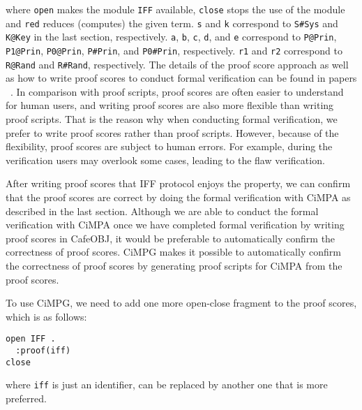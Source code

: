\documentclass[10pt, conference, compsocconf]{IEEEtran}
\begin{document}
	\noindent
	where \verb!open! makes the module \verb!IFF! available, \verb!close! stops the use of the module and \verb!red! reduces (computes) the given term. 
	\verb!s! and \verb!k! correspond to \verb!S#Sys! and \verb!K@Key! in the last section, respectively.
	\verb!a!, \verb!b!, \verb!c!, \verb!d!, and \verb!e! correspond to \verb!P@Prin!, \verb!P1@Prin!, \verb!P0@Prin!, \verb!P#Prin!, and \verb!P0#Prin!, respectively.
	\verb!r1! and \verb!r2! correspond to \verb!R@Rand! and \verb!R#Rand!, respectively.
	The details of the proof score approach as well as how to write proof scores to conduct formal verification can be found in papers ~\cite{OgataF03fmoods}.
	In comparison with proof scripts, proof scores are often easier to understand for human users, and writing proof scores are also more flexible than writing proof scripts.
	That is the reason why when conducting formal verification, we prefer to write proof scores rather than proof scripts.
	However, because of the flexibility, proof scores are subject to human errors.
	For example, during the verification users may overlook some cases, leading to the flaw verification.
	
	
	After writing proof scores that IFF protocol enjoys the property, we can confirm that the proof scores are correct by doing the formal verification with CiMPA as described in the last
	section. Although we are able to conduct the formal verification with
	CiMPA once we have completed formal verification by writing proof
	scores in CafeOBJ, it would be preferable to automatically confirm the
	correctness of proof scores. CiMPG makes it possible to automatically
	confirm the correctness of proof scores by generating proof scripts
	for CiMPA from the proof scores.
	
	To use CiMPG, we need to add one more open-close fragment to the proof
	scores, which is as follows:
	
	\smallskip
	\begin{small}
		\noindent
		\verb!open IFF .!\\
		\verb!  :proof(iff)!\\
		\verb!close!
		\smallskip
	\end{small}
	
	
	\noindent
	where \verb!iff! is just an identifier, can be replaced by another one that is more preferred.
	
\end{document}
